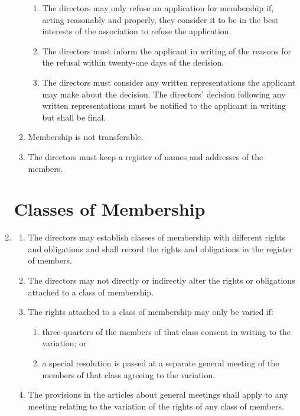 \begin{enumerate}
\begin{enumerate}
    \begin{enumerate}
    \item
      The directors may only refuse an application for membership if,
      acting reasonably and properly, they consider it to be in the best
      interests of the association to refuse the application.
    \item
      The directors must inform the applicant in writing of the reasons
      for the refusal within twenty-one days of the decision.
    \item
      The directors must consider any written representations the
      applicant may make about the decision. The directors' decision
      following any written representations must be notified to the
      applicant in writing but shall be final.
    \end{enumerate}
  \item
    Membership is not transferable.
  \item
    The directors must keep a register of names and addresses of the
    members.
  \end{enumerate}

\section{Classes of Membership}

\item
  \label{cls:members}
  \begin{enumerate}
  \item
    The directors may establish classes of membership with different
    rights and obligations and shall record the rights and obligations
    in the register of members.
  \item
    The directors may not directly or indirectly alter the rights or
    obligations attached to a class of membership.
  \item
    The rights attached to a class of membership may only be varied if:
    \begin{enumerate}
    \item
      three-quarters of the members of that class consent in writing to
      the variation; or
    \item
      a special resolution is passed at a separate general meeting of the
      members of that class agreeing to the variation.
    \end{enumerate}
  \item
    The provisions in the articles about general meetings shall apply
    to any meeting relating to the variation of the rights of any class
    of members.
  \end{enumerate}


\end{enumerate}
